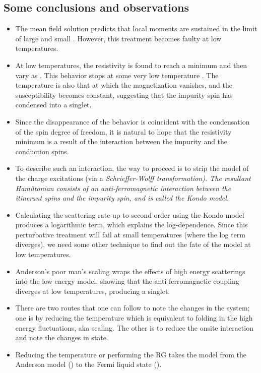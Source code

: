 \documentclass[12pt,twoside]{report}
\numberwithin{equation}{section}
\begin{document}
\subsection{Some conclusions and observations}
\begin{itemize}
    \item The mean field solution predicts that local moments are sustained in the limit of large  and small . However, this treatment becomes faulty at low temperatures.
    \item At low temperatures, the resistivity is found to reach a minimum and then vary as . This behavior stops at some very low temperature . The temperature  is also that at which the magnetization vanishes, and the susceptibility becomes constant, suggesting that the impurity spin has condensed into a singlet.
    \item Since the disappearance of the  behavior is coincident with the condensation of the spin degree of freedom, it is natural to hope that the resistivity minimum is a result of the interaction between the impurity and the conduction spins.
    \item To describe such an interaction, the way to proceed is to strip the model of the charge excitations (via a \it{Schrieffer-Wolff transformation}).
The resultant Hamiltonian consists of an anti-ferromagnetic interaction between the itinerant spins and the impurity spin, and is called the Kondo model.
    \item Calculating the scattering rate up to second order using the Kondo model produces a logarithmic term, which explains the log-dependence. Since this perturbative treatment will fail at small temperatures (where the log term diverges), we need some other technique to find out the fate of the model at low temperatures.
    \item Anderson's poor man's scaling wraps the effects of high energy scatterings into the low energy model, showing that the anti-ferromagnetic coupling diverges at low temperatures, producing a singlet.
    \item There are two routes that one can follow to note the changes in the system; one is by reducing the temperature which is equivalent to folding in the high energy fluctuations, aka scaling.
The other is to reduce the onsite interaction  and note the changes in state.
    \item Reducing the temperature or performing the RG takes the model from the Anderson model () to the Fermi liquid state ().

\end{itemize}
\end{document}
